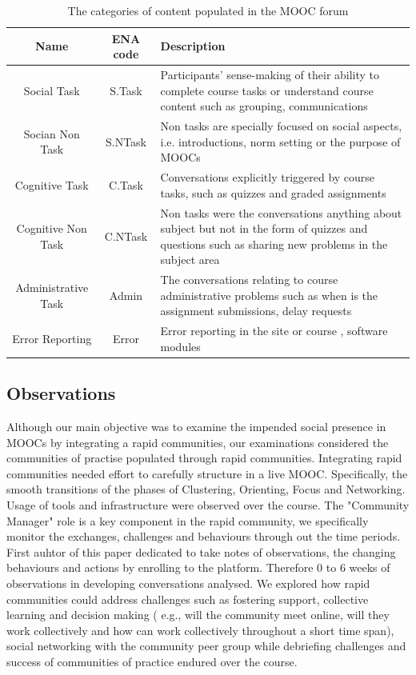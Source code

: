 \documentclass[manuscript,screen,review]{acmart}
\begin{document}
\begin{table}[h!]
\caption{The categories of content populated in the MOOC forum}
\label{tab:ENAContent}
\begin{center}
    \begin{tabular}{c|c|p{7cm}}
    \toprule
     Name & ENA code & Description  \\
     \midrule
     Social Task  & S.Task  & Participants’ sense-making of their ability to complete course tasks or understand course content such as grouping,                                        communications          
     \\ \hline
    Socian Non Task  & S.NTask & Non tasks are specially focused on social aspects, i.e. introductions, norm setting or the purpose of MOOCs                    
    \\ \hline
    Cognitive Task  & C.Task  & Conversations explicitly triggered by course tasks, such as quizzes and graded assignments 
    \\ \hline
    Cognitive Non Task & C.NTask & Non tasks were the conversations anything about subject but not in the form of quizzes and questions such as sharing new problems in the subject area 
    \\ \hline
    Administrative Task & Admin & The conversations relating to course administrative problems such as when is the assignment submissions, delay requests 
    \\ \hline
    Error Reporting & Error & Error  reporting in the site or course , software modules   
    \bottomrule
    \end{tabular}
    \end{center}
    \end{table}



\subsection{Observations}
Although our main objective was to examine the impended social presence in MOOCs by integrating a rapid communities, our examinations considered the communities of practise populated through rapid communities. Integrating rapid communities needed effort to carefully structure in a live MOOC. Specifically, the smooth transitions of the phases of Clustering, Orienting, Focus  and Networking. Usage of tools and infrastructure were observed over the course. The "Community Manager" role is a key component in the rapid community, we specifically monitor the exchanges, challenges and behaviours through out the time periods. First auhtor of this paper dedicated to take notes of observations, the changing behaviours and actions by enrolling to the platform. Therefore 0 to 6 weeks of observations in developing conversations analysed. We explored how rapid communities could address challenges such as  fostering support, collective learning and decision making ( e.g., will the community meet online, will they work collectively and how can work collectively throughout a short time span), social networking with the community peer group while debriefing challenges and success of communities of practice endured over the course. 
\end{document}
